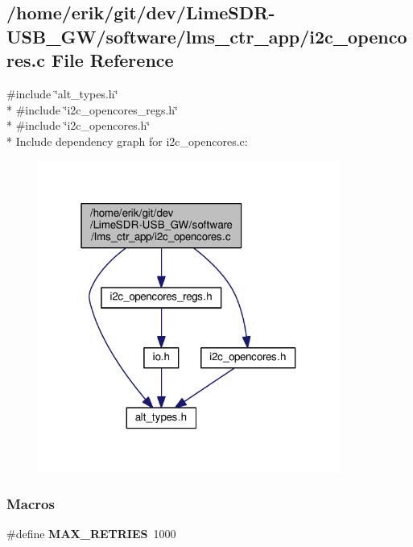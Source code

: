 \subsection{/home/erik/git/dev/\+Lime\+S\+D\+R-\/\+U\+S\+B\+\_\+\+G\+W/software/lms\+\_\+ctr\+\_\+app/i2c\+\_\+opencores.c File Reference}
\label{software_2lms__ctr__app_2i2c__opencores_8c}
{\ttfamily \#include \char`\"{}alt\+\_\+types.\+h\char`\"{}}\\*
{\ttfamily \#include \char`\"{}i2c\+\_\+opencores\+\_\+regs.\+h\char`\"{}}\\*
{\ttfamily \#include \char`\"{}i2c\+\_\+opencores.\+h\char`\"{}}\\*
Include dependency graph for i2c\+\_\+opencores.\+c\+:
\nopagebreak
\begin{figure}[H]
\begin{center}
\leavevmode
\includegraphics[width=280pt]{d6/dc3/software_2lms__ctr__app_2i2c__opencores_8c__incl}
\end{center}
\end{figure}
\subsubsection*{Macros}
\begin{DoxyCompactItemize}
\item 
\#define {\bf M\+A\+X\+\_\+\+R\+E\+T\+R\+I\+ES}~1000
\end{DoxyCompactItemize}
